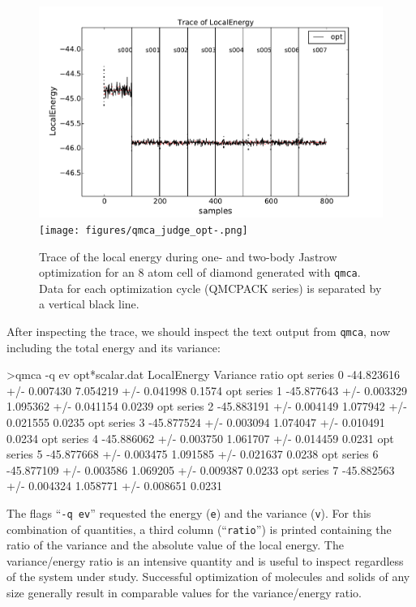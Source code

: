 \begin{figure}
\begin{center}
\ifpdf
\includegraphics[trim = 0mm 0mm 0mm 0mm, clip,width=0.9\columnwidth]{figures/qmca_judge_opt.pdf}
\else
\texttt{[image: figures/qmca\_judge\_opt-.png]}
\fi
\end{center}
\caption{Trace of the local energy during one- and two-body Jastrow optimization for an 8 atom cell of diamond generated with \texttt{qmca}.  Data for each optimization cycle (QMCPACK series) is separated by a vertical black line.
}
\label{fig:qmca_judge_opt}
\end{figure}

After inspecting the trace, we should inspect the text output 
from \texttt{qmca}, now including the total energy and its variance:
\begin{shade}
>qmca -q ev opt*scalar.dat
                            LocalEnergy               Variance           ratio 
opt  series 0  -44.823616 +/- 0.007430   7.054219 +/- 0.041998   0.1574 
opt  series 1  -45.877643 +/- 0.003329   1.095362 +/- 0.041154   0.0239 
opt  series 2  -45.883191 +/- 0.004149   1.077942 +/- 0.021555   0.0235 
opt  series 3  -45.877524 +/- 0.003094   1.074047 +/- 0.010491   0.0234 
opt  series 4  -45.886062 +/- 0.003750   1.061707 +/- 0.014459   0.0231 
opt  series 5  -45.877668 +/- 0.003475   1.091585 +/- 0.021637   0.0238 
opt  series 6  -45.877109 +/- 0.003586   1.069205 +/- 0.009387   0.0233 
opt  series 7  -45.882563 +/- 0.004324   1.058771 +/- 0.008651   0.0231 
\end{shade}
\noindent
The flags ``\texttt{-q ev}'' requested the energy (\texttt{e}) and 
the variance (\texttt{v}).  For this combination of quantities, a 
third column (``\texttt{ratio}'') is printed containing the ratio 
of the variance and the absolute value of the local energy.
The variance/energy ratio is an intensive quantity and is useful  
to inspect regardless of the system under study.  Successful 
optimization of molecules and solids of any size generally result 
in comparable values for the variance/energy ratio. 

